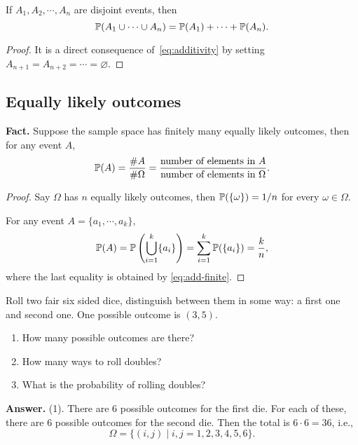   \begin{corollary}
    If $A_1, A_2, \cdots, A_n$ are disjoint events, then
    \begin{equation}
      \label{eq:add-finite}
      \mathbb{P}(A_1\cup \cdots \cup A_n) = \mathbb{P}(A_1) + \cdots + \mathbb{P}(A_n).
    \end{equation}
  \end{corollary}

  \begin{proof}
    It is a direct consequence of~\eqref{eq:additivity} by setting $A_{n+1} =
    A_{n+2} =\cdots = \varnothing$.
  \end{proof}


  \subsection{Equally likely outcomes}
  \label{subsec:1.2}
  \textbf{Fact.} Suppose the sample space has finitely many equally likely
  outcomes, then for any event $A$,
  \[
    \mathbb{P}(A) = \frac{\# A}{\# \Omega} = \frac{\text{number of elements in
        $A$}}{\text{number of elements in $\Omega$}}.
  \]
  \begin{proof}
    Say $\Omega$ has $n$ equally likely outcomes, then $\mathbb{P}(\{\omega\}) = 1/n$ for
    every $\omega \in \Omega$.

    For any event $A = \{a_1, \cdots, a_k\}$,
    \[
      \mathbb{P}(A) = \mathbb{P}\left( \bigcup_{i=1}^k \{a_i\}\right) =
      \sum_{i=1}^k\mathbb{P}(\{a_i\}) = \frac{k}{n},
    \]
    where the last equality is obtained by \eqref{eq:add-finite}.
  \end{proof}

  \begin{example}
    Roll two fair six sided dice, distinguish between them in some way: a first
    one and second one. One possible outcome is $(3,5)$.
    \begin{enumerate}
      [(1)]
    \item How many possible outcomes are there?
    \item How many ways to roll doubles?
    \item What is the probability of rolling doubles?
    \end{enumerate}
  \end{example}

  \textbf{Answer.} (1). There are $6$ possible outcomes for the first die. For
  each of these, there are $6$ possible outcomes for the second die. Then the
  total is $6\cdot 6 = 36$, i.e.,
  \[
    \Omega = \{(i,j)\mid i,j = 1,2,3,4,5,6\}.
  \]

